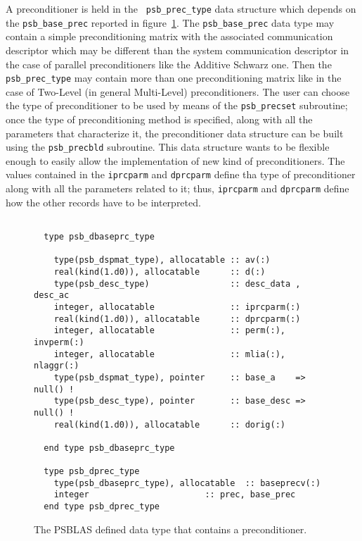  A preconditioner is held in the \hypertarget{precdata}{{\tt
    psb\_prec\_type}} data structure which depends on the
\verb|psb_base_prec| reported in 
figure~\ref{fig:prectype}. The \verb|psb_base_prec| 
data type may contain a simple preconditioning matrix with the
associated communication descriptor which may be different than the
system communication descriptor in the case of parallel
preconditioners like the Additive Schwarz one. Then the
\verb|psb_prec_type| may contain more than one preconditioning matrix
like in the case of Two-Level (in general Multi-Level) preconditioners.
The user can choose the type of preconditioner to be used by means of
the \verb|psb_precset| subroutine; once the type of preconditioning
method is specified, along with all the parameters that characterize
it, the preconditioner data structure can be built using the
\verb|psb_precbld| subroutine.
This data structure wants to be flexible enough to easily allow the
implementation of new kind of preconditioners. The values contained in
the \verb|iprcparm| and \verb|dprcparm| define tha type of
preconditioner along with all the parameters related to it; thus,
\verb|iprcparm| and \verb|dprcparm| define how the other records have
to be interpreted.
\begin{figure}[h!]
  \small
  \begin{Sbox}
    \begin{minipage}[tl]{0.9\textwidth}
\begin{verbatim}

  type psb_dbaseprc_type

    type(psb_dspmat_type), allocatable :: av(:) 
    real(kind(1.d0)), allocatable      :: d(:)  
    type(psb_desc_type)                :: desc_data , desc_ac
    integer, allocatable               :: iprcparm(:) 
    real(kind(1.d0)), allocatable      :: dprcparm(:) 
    integer, allocatable               :: perm(:),  invperm(:) 
    integer, allocatable               :: mlia(:), nlaggr(:) 
    type(psb_dspmat_type), pointer     :: base_a    => null() !
    type(psb_desc_type), pointer       :: base_desc => null() ! 
    real(kind(1.d0)), allocatable      :: dorig(:) 

  end type psb_dbaseprc_type
  
  type psb_dprec_type
    type(psb_dbaseprc_type), allocatable  :: baseprecv(:) 
    integer                       :: prec, base_prec
  end type psb_dprec_type

\end{verbatim}
    \end{minipage}
  \end{Sbox}
  \setlength{\fboxsep}{8pt}
  \begin{center}
    \fbox{\TheSbox}
  \end{center}
  \caption{\label{fig:prectype}The PSBLAS defined data type that contains a preconditioner.}
\end{figure}
